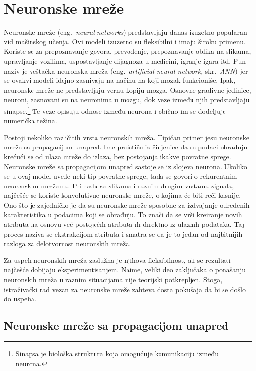 \chapter{Neuronske mreže}
\label{ch:nn}

Neuronske mreže (eng.~{\em neural networks}) predstavljaju danas izuzetno popularan vid mašinskog učenja. Ovi modeli izuzetno su fleksibilni i imaju široku primenu.  Koriste se za prepoznavanje govora, prevođenje, prepoznavanje oblika na slikama, upravljanje vozilima, uspostavljanje dijagnoza u medicini, igranje igara itd. Pun naziv je veštačka neuronska mreža (eng.~{\em artificial neural network}, skr.~{\em ANN}) jer se ovakvi modeli idejno zasnivaju na načinu na koji mozak funkcioniše. Ipak, neuronske mreže ne predstavljaju vernu kopiju mozga. Osnovne gradivne jedinice, neuroni, zasnovani su na neuronima u mozgu, dok veze između njih predstavljaju sinapse.\footnote{Sinapsa je biološka struktura koja omogućuje komunikaciju između neurona.} Te veze opisuju odnose između neurona i obično im se dodeljuje numerička težina.

\par
Postoji nekoliko različitih vrsta neuronskih mreža. Tipičan primer jesu neuronske mreže sa propagacijom unapred. Ime proističe iz činjenice da se podaci obrađuju krećući se od ulaza mreže do izlaza, bez postojanja ikakve povratne sprege. Neuronske mreže sa propagacijom unapred sastoje se iz slojeva neurona. Ukoliko se u ovaj model uvede neki tip povratne sprege, tada se govori o rekurentnim neuronskim mrežama. Pri radu sa slikama i raznim drugim vrstama signala, najčešće se koriste konvolutivne neuronske mreže, o kojima će biti reči kasnije. Ono što je zajedničko je da su neuronske mreže sposobne za izdvajanje određenih karakteristika u podacima koji se obrađuju. To znači da se vrši kreiranje novih atributa na osnovu već postojećih atributa ili direktno iz ulaznih podataka. Taj proces naziva se ekstrakcijom atributa i smatra se da je to jedan od najbitnijih razloga za delotvornost neuronskih mreža.
\par
Za uspeh neuronskih mreža zaslužna je njihova fleksibilnost, ali se rezultati najčešće dobijaju eksperimentisanjem. Naime, veliki deo zaključaka o ponašanju neuronskih mreža u raznim situacijama nije teorijski potkrepljen. Stoga, istraživački rad vezan za neuronske mreže zahteva dosta pokušaja da bi se došlo do uspeha.

\section{Neuronske mreže sa propagacijom unapred}

